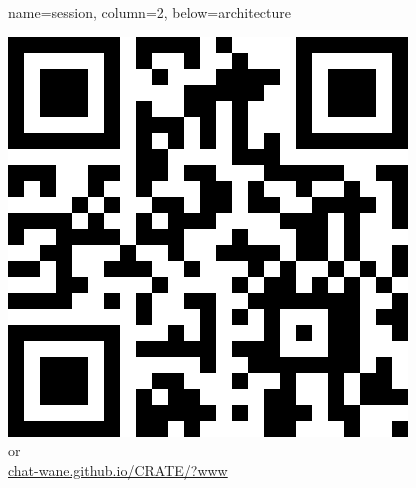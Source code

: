 \documentclass[a1paper, fontscale=0.38, portrait]{baposter}
\begin{document}
\begin{poster}
  {name=session, column=2, below=architecture} {
    \begin{center}
      \includegraphics[scale=0.25]{img/qrcode.png}
      \\or\\
      \url{chat-wane.github.io/CRATE/?www}
    \end{center}
  }

\end{poster}
\end{document}
